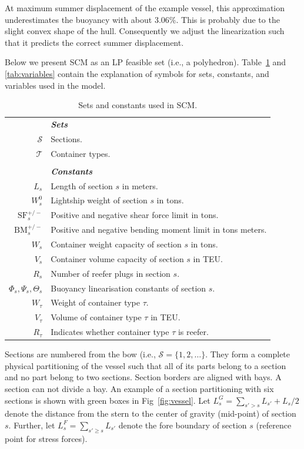\documentclass[runningheads]{llncs}
\begin{document}
At maximum summer displacement of the example vessel, this approximation underestimates the buoyancy with about $3.06\%$. This is probably due to the slight convex shape of the hull. Consequently we adjust the linearization such that it predicts the correct summer displacement. 

Below we present SCM as an LP feasible set (i.e., a polyhedron). Table~\ref{tab:setsconstants} and \ref{tab:variables} contain the explanation of symbols for sets, constants, and variables used in the model. 

\begin{table}[h!]
\begin{center}
\begin{tabular}{rl}
    & \textbf{\textit{Sets}}\\
    $\mathcal{S}$ & Sections.\\
    $\mathcal{T}$ & Container types. \\
    & \\
    & \textbf{\textit{Constants}}\\
    $L_s$         & Length of section $s$ in meters.\\
    $W^0_s$       & Lightship weight of section $s$ in tons.\\
    $\mathrm{SF}^{+/-}_s$ & Positive and negative shear force limit in tons.\\ 
    $\mathrm{BM}^{+/-}_s$ & Positive and negative bending moment limit in tons meters.\\ 
    $W_s$         & Container weight capacity of section $s$ in tons.\\
    $V_s$         & Container volume capacity of section $s$ in TEU.\\
    $R_s$         & Number of reefer plugs in section $s$.\\ 
    $\Phi_s,\Psi_s,\Theta_s$ & Buoyancy linearisation constants of section $s$.\\        
    $W_\tau$      & Weight of container type $\tau$.\\
    $V_\tau$      & Volume of container type $\tau$ in TEU.\\
    $R_\tau$      & Indicates whether container type $\tau$ is reefer.\\
\end{tabular}
\end{center}
\caption{Sets and constants used in SCM.}
\label{tab:setsconstants}
\end{table}

Sections are numbered from the bow (i.e., $\mathcal{S} = \{ 1,2,\ldots \}$. They form a complete physical partitioning of the vessel such that all of its parts belong to a section and no part belong to two sections. Section borders are aligned with bays. A section can not divide a bay. An example of a section partitioning with six sections is shown with green boxes in Fig~\ref{fig:vessel}. Let $L^G_s = \sum_{s'>s} L_{s'} + L_s / 2$ denote the distance from the stern to the center of gravity (mid-point) of section $s$. Further, let $L^F_s = \sum_{s' \geq s} L_{s'}$ denote the fore boundary of section $s$ (reference point for stress forces).
\end{document}
